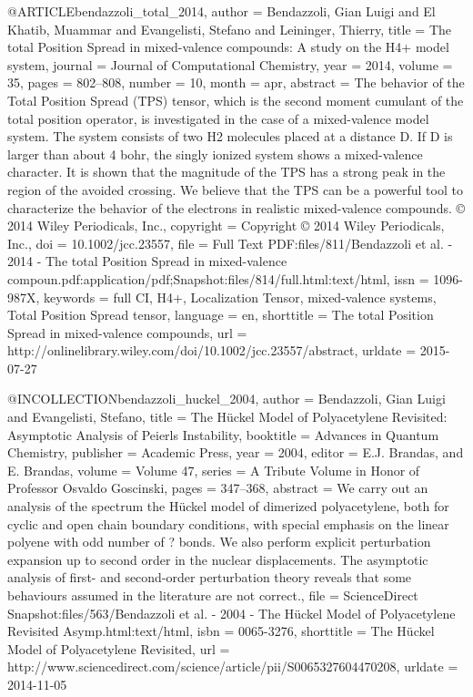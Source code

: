 @ARTICLE{bendazzoli_total_2014,
  author = {Bendazzoli, Gian Luigi and El Khatib, Muammar and Evangelisti, Stefano
	and Leininger, Thierry},
  title = {The total {Position} {Spread} in mixed-valence compounds: {A} study
	on the {H}4+ model system},
  journal = {Journal of Computational Chemistry},
  year = {2014},
  volume = {35},
  pages = {802--808},
  number = {10},
  month = apr,
  abstract = {The behavior of the Total Position Spread (TPS) tensor, which is the
	second moment cumulant of the total position operator, is investigated
	in the case of a mixed-valence model system. The system consists
	of two H2 molecules placed at a distance D. If D is larger than about
	4 bohr, the singly ionized system shows a mixed-valence character.
	It is shown that the magnitude of the TPS has a strong peak in the
	region of the avoided crossing. We believe that the TPS can be a
	powerful tool to characterize the behavior of the electrons in realistic
	mixed-valence compounds. © 2014 Wiley Periodicals, Inc.},
  copyright = {Copyright © 2014 Wiley Periodicals, Inc.},
  doi = {10.1002/jcc.23557},
  file = {Full Text PDF:files/811/Bendazzoli et al. - 2014 - The total Position Spread in mixed-valence    compoun.pdf:application/pdf;Snapshot:files/814/full.html:text/html},
  issn = {1096-987X},
  keywords = {full CI, H4+, Localization Tensor, mixed-valence systems, Total Position
	Spread tensor},
  language = {en},
  shorttitle = {The total {Position} {Spread} in mixed-valence compounds},
  url = {http://onlinelibrary.wiley.com/doi/10.1002/jcc.23557/abstract},
  urldate = {2015-07-27}
}

@INCOLLECTION{bendazzoli_huckel_2004,
  author = {Bendazzoli, Gian Luigi and Evangelisti, Stefano},
  title = {The {Hückel} {Model} of {Polyacetylene} {Revisited}: {Asymptotic}
	{Analysis} of {Peierls} {Instability}},
  booktitle = {Advances in {Quantum} {Chemistry}},
  publisher = {Academic Press},
  year = {2004},
  editor = {E.J. Brandas, {and} E. Brandas},
  volume = {Volume 47},
  series = {A {Tribute} {Volume} in {Honor} of {Professor} {Osvaldo} {Goscinski}},
  pages = {347--368},
  abstract = {We carry out an analysis of the spectrum the Hückel model of dimerized
	polyacetylene, both for cyclic and open chain boundary conditions,
	with special emphasis on the linear polyene with odd number of ?
	bonds. We also perform explicit perturbation expansion up to second
	order in the nuclear displacements. The asymptotic analysis of first-
	and second-order perturbation theory reveals that some behaviours
	assumed in the literature are not correct.},
  file = {ScienceDirect Snapshot:files/563/Bendazzoli et al. - 2004 - The Hückel Model of Polyacetylene    Revisited Asymp.html:text/html},
  isbn = {0065-3276},
  shorttitle = {The {Hückel} {Model} of {Polyacetylene} {Revisited}},
  url = {http://www.sciencedirect.com/science/article/pii/S0065327604470208},
  urldate = {2014-11-05}
}

